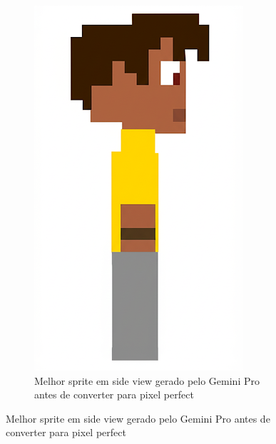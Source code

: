 \begin{figure}[htbp]
    \centering
    \caption{\small Processo de edição do melhor sprite em side view no Pixilart}
    \label{fig:geminiProSideEdicaoMelhor}
    \begin{subfigure}{0.32\linewidth}
        \includegraphics[width=1\linewidth]{figs/geminiPro/chat6/tela3_res1.png}
        \caption{\small Melhor sprite em side view gerado pelo Gemini Pro antes de converter para pixel perfect}
        \label{fig:geminiProSideEdicaoMelhorAntesEdicao}
    \end{subfigure}\hfill

\end{figure}
